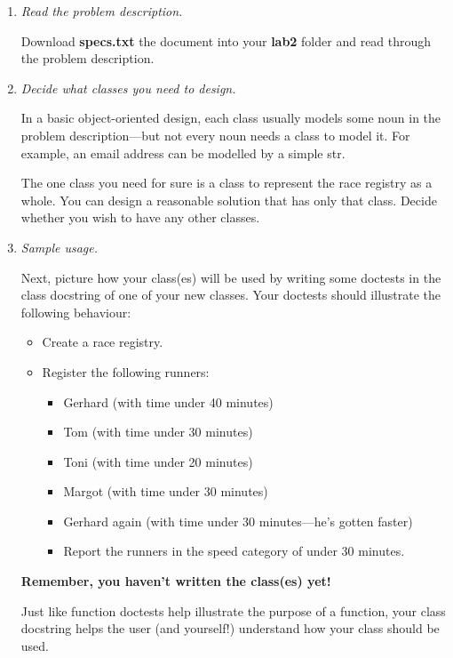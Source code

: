 \documentclass[12pt]{article}
\begin{document}
\begin{enumerate}[1.]
\item \textit{Read the problem description.}

Download \textbf{specs.txt} the document into your \textbf{lab2} folder and read through the problem description.

\item \textit{Decide what classes you need to design.}

In a basic object-oriented design, each class usually models some noun in the problem description—but not every noun needs a class to model it. For example, an email address can be modelled by a simple str.

\bigskip

The one class you need for sure is a class to represent the race registry as a whole. You can design a reasonable solution that has only that class. Decide whether you wish to have any other classes.

\item \textit{Sample usage.}

Next, picture how your class(es) will be used by writing some doctests in the class docstring of one of your new classes. Your doctests should illustrate the following behaviour:

\begin{itemize}
    \item Create a race registry.
    \item Register the following runners:
    \begin{itemize}
        \item Gerhard (with time under 40 minutes)
        \item Tom (with time under 30 minutes)
        \item Toni (with time under 20 minutes)
        \item Margot (with time under 30 minutes)
        \item Gerhard again (with time under 30 minutes—he’s gotten faster)
        \item Report the runners in the speed category of under 30 minutes.
    \end{itemize}
\end{itemize}

\bigskip

\textbf{Remember, you haven’t written the class(es) yet!}

Just like function doctests help illustrate the purpose of a function, your class docstring helps the user (and yourself!) understand how your class should be used.


\end{enumerate}
\end{document}
